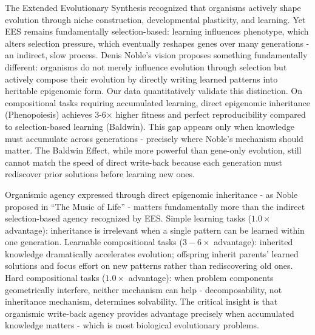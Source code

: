 \documentclass[11pt]{article}
\begin{document}
The Extended Evolutionary Synthesis recognized that organisms actively shape evolution through niche construction, developmental plasticity, and learning. Yet EES remains fundamentally selection-based: learning influences phenotype, which alters selection pressure, which eventually reshapes genes over many generations - an indirect, slow process. Denis Noble's vision proposes something fundamentally different: organisms do not merely influence evolution through selection but actively compose their evolution by directly writing learned patterns into heritable epigenomic form. Our data quantitatively validate this distinction. On compositional tasks requiring accumulated learning, direct epigenomic inheritance (Phenopoiesis) achieves 3-6× higher fitness and perfect reproducibility compared to selection-based learning (Baldwin). This gap appears only when knowledge must accumulate across generations - precisely where Noble's mechanism should matter. The Baldwin Effect, while more powerful than gene-only evolution, still cannot match the speed of direct write-back because each generation must rediscover prior solutions before learning new ones.

Organismic agency expressed through direct epigenomic inheritance - as Noble proposed in ``The Music of Life'' - matters fundamentally more than the indirect selection-based agency recognized by EES. Simple learning tasks ($1.0×$ advantage): inheritance is irrelevant when a single pattern can be learned within one generation. Learnable compositional tasks ($3-6×$ advantage): inherited knowledge dramatically accelerates evolution; offspring inherit parents' learned solutions and focus effort on new patterns rather than rediscovering old ones. Hard compositional tasks ($1.0×$ advantage): when problem components geometrically interfere, neither mechanism can help - decomposability, not inheritance mechanism, determines solvability. The critical insight is that organismic write-back agency provides advantage precisely when accumulated knowledge matters - which is most biological evolutionary problems.
\end{document}
